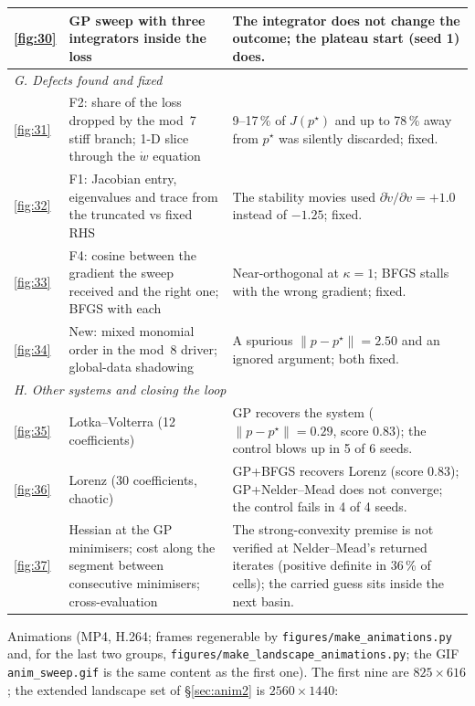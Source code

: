 \documentclass[10pt]{article}
\newcommand{\pstar}{p^\star}
\newcommand{\perr}{\lVert p - \pstar\rVert}
\begin{document}
\begin{longtable}{p{} p{} p{}}
\ref{fig:30} & GP sweep with three integrators inside the loss & The integrator does not change the outcome; the plateau start (seed 1) does.\\
\midrule
\multicolumn{3}{l}{\emph{G. Defects found and fixed}}\\
\ref{fig:31} & F2: share of the loss dropped by the mod~7 stiff branch; 1-D slice through the $\dot w$ equation & 9--17\,\% of $J(\pstar)$ and up to 78\,\% away from $\pstar$ was silently discarded; fixed.\\
\ref{fig:32} & F1: Jacobian entry, eigenvalues and trace from the truncated vs fixed RHS & The stability movies used $\partial\dot v/\partial v=+1.0$ instead of $-1.25$; fixed.\\
\ref{fig:33} & F4: cosine between the gradient the sweep received and the right one; BFGS with each & Near-orthogonal at $\kappa=1$; BFGS stalls with the wrong gradient; fixed.\\
\ref{fig:34} & New: mixed monomial order in the mod~8 driver; global-data shadowing & A spurious $\perr=2.50$ and an ignored argument; both fixed.\\
\midrule
\multicolumn{3}{l}{\emph{H. Other systems and closing the loop}}\\
\ref{fig:35} & Lotka--Volterra (12 coefficients) & GP recovers the system ($\perr=0.29$, score 0.83); the control blows up in 5 of 6 seeds.\\
\ref{fig:36} & Lorenz (30 coefficients, chaotic) & GP+BFGS recovers Lorenz (score 0.83); GP+Nelder--Mead does not converge; the control fails in 4 of 4 seeds.\\
\ref{fig:37} & Hessian at the GP minimisers; cost along the segment between consecutive minimisers; cross-evaluation & The strong-convexity premise is not verified at Nelder--Mead's returned iterates (positive definite in 36\,\% of cells); the carried guess sits inside the next basin.\\
\bottomrule
\end{longtable}
\normalsize
\noindent Animations (MP4, H.264; frames regenerable by \texttt{figures/make\_animations.py} and, for the last two groups, \texttt{figures/make\_landscape\_animations.py}; the GIF \texttt{anim\_sweep.gif} is the same content as the first one). The first nine are $825\times616$; the extended landscape set of \S\ref{sec:anim2} is $2560\times1440$:
\end{document}
